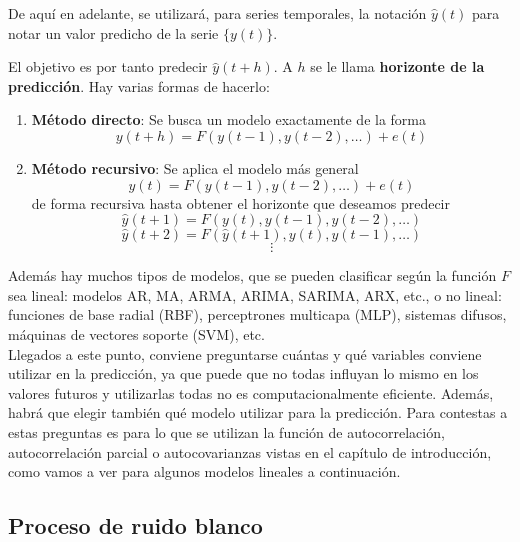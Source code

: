 \begin{nota}
De aquí en adelante, se utilizará, para series temporales, la notación $\widehat{y}(t)$ para notar un valor predicho de la serie $\{y(t)\}$.
\end{nota}

El objetivo es por tanto predecir $\widehat{y}(t+h)$. A $h$ se le llama \textbf{horizonte de la predicción}. Hay varias formas de hacerlo:
\begin{enumerate}
\item \textbf{Método directo}: Se busca un modelo exactamente de la forma
\[	y(t+h) = F(y(t-1), y(t-2),\dots) + e(t)	\]
\item \textbf{Método recursivo}: Se aplica el modelo más general
\[	y(t) = F(y(t-1), y(t-2),\dots)+e(t)	\]
de forma recursiva hasta obtener el horizonte que deseamos predecir
\[	\widehat{y}(t+1) = F(y(t), y(t-1), y(t-2),\dots)	\]
\[	\widehat{y}(t+2) = F(\widehat{y}(t+1),y(t),y(t-1),\dots)	\]
\[ \vdots	\]
\end{enumerate}

Además hay muchos tipos de modelos, que se pueden clasificar según la función $F$ sea lineal: modelos AR, MA, ARMA, ARIMA, SARIMA, ARX, etc., o no lineal: funciones de base radial (RBF), perceptrones multicapa (MLP), sistemas difusos, máquinas de vectores soporte (SVM), etc.\\

Llegados a este punto, conviene preguntarse cuántas y qué variables conviene utilizar en la predicción, ya que puede que no todas influyan lo mismo en los valores futuros y utilizarlas todas no es computacionalmente eficiente. Además, habrá que elegir también qué modelo utilizar para la predicción. Para contestas a estas preguntas es para lo que se utilizan la función de autocorrelación, autocorrelación parcial o autocovarianzas vistas en el capítulo de introducción, como vamos a ver para algunos modelos lineales a continuación.\\

\subsection{Proceso de ruido blanco}

